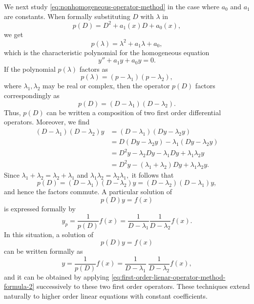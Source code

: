 We next study \eqref{eq:nonhomogeneous-operator-method} in the case where $a_0$ and $a_1$ are constants. 
When  formally substituting $D$  with $\lambda$ in  \[p(D) = D^2 + a_1(x) D+a_0(x),\] we get  \[p(\lambda) = \lambda^2 +a_1\lambda +a_0,\] which is the characteristic polynomial for the  homogeneous equation
\[y''+a_1y+a_0y=0.\] 
If the polynomial $p(\lambda)$ factors as
\[p(\lambda)= (p-\lambda_1)(p-\lambda_2),\] where $\lambda_1, \lambda_2$ may be real or complex, then the operator $p(D)$ factors correspondingly as
\[p(D) = (D-\lambda_1)(D-\lambda_2).\] Thus, $p(D)$ can be written a composition of two first order differential operators. Moreover,   we find
\[
\begin{split}
	(D-\lambda_1)(D-\lambda_2)y& = (D-\lambda_1)(Dy-\lambda_2y)\\
	&=D(Dy-\lambda_2y)-\lambda_1(Dy-\lambda_2y)\\
	&=D^2y- \lambda_2Dy- \lambda_1Dy+ \lambda_1\lambda_2y\\
	&=D^2y- (\lambda_1+\lambda_2)Dy+ \lambda_1\lambda_2y.\
\end{split} 
\]
Since $\lambda_1+\lambda_2 = \lambda_2+\lambda_1$ and $\lambda_1\lambda_2= \lambda_2\lambda_1,$ it follows that 
\[p(D) =(D-\lambda_1)(D-\lambda_2)y= (D-\lambda_2)(D-\lambda_1)y,\] and hence the factors commute. 	
A particular solution of 
\[p(D)y = f(x)\] is expressed formally by
\[y_p = \frac{1}{p(D)}f(x) = \frac{1}{D-\lambda_1}\frac{1}{D-\lambda_2} f(x).\]
 In this situation, a solution of \[p(D)y = f(x)\] can be written formally as 
 \begin{equation}\label{eq:operator-form-formula-for-particular-solutions}
 \boxed{y = \frac{1}{p(D)}f(x) =\frac{1}{D-\lambda_1}\; \frac{1}{D-\lambda_2} f(x),}
 \end{equation} 
 and it  can be obtained by applying \eqref{eq:first-order-lienar-operator-method-formula-2} successively to these two first order operators. These techniques extend naturally to higher order linear equations with constant coefficients. 

